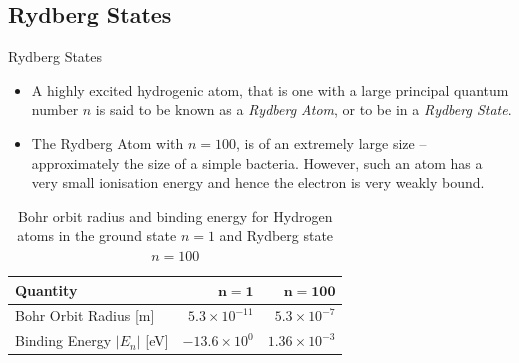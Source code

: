 \documentclass[xcolor=dvipsnames,t]{beamer}
\begin{document}
    \subsection{Rydberg States}
    \begin{frame}{Rydberg States}  
        \begin{itemize} 
            \item A highly excited hydrogenic atom, that is one with a large principal quantum 
                  number $n$ is said to be known as a \emph{Rydberg Atom}, or to be in a
                  \emph{Rydberg State}.

            \item The Rydberg Atom with $n = 100$, is of an extremely large size -- approximately the size
    of a simple bacteria. However, such an atom has a very small ionisation energy and hence
    the electron is very weakly bound.
        \end{itemize} 
 
    \begin{table} 
        \caption{Bohr orbit radius and binding energy for Hydrogen atoms in 
                 the ground state $n=1$ and Rydberg state $n=100$} 
        \label{tbl:rydberg} 
        \centering
        \begin{tabular}{p{5cm}rr} \hline
            {\bf Quantity}               & $\mathbf{n = 1}$          & $\mathbf{n = 100}$ \\ \hline \hline 
            Bohr Orbit Radius [m]        &  $5.3 \times 10^{-11}$    & $5.3 \times 10^{-7}$ \\ 
            Binding Energy $|E_n|$ [eV]  &  $-13.6 \times 10^0$      & $1.36 \times 10^{-3}$ \\ \hline
        \end{tabular}
    \end{table} 

   \end{frame} 
\end{document}
